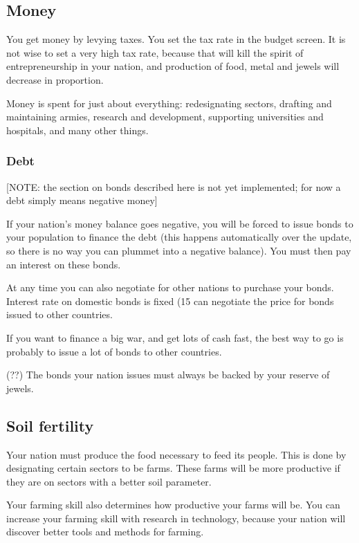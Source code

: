 \subsection{Money}
You get money by levying taxes.  You set the tax rate in the budget
screen.  It is not wise to set a very high tax rate, because that will
kill the spirit of entrepreneurship in your nation, and production of
food, metal and jewels will decrease in proportion.

Money is spent for just about everything: redesignating sectors,
drafting and maintaining armies, research and development, supporting
universities and hospitals, and many other things.

\subsubsection{Debt}

[NOTE: the section on bonds described here is not yet implemented;
for now a debt simply means negative money]

If your nation's money balance goes negative, you will be forced to
issue bonds to your population to finance the debt (this happens
automatically over the update, so there is no way you can plummet into
a negative balance).  You must then pay an interest on these bonds.

At any time you can also negotiate for other nations to purchase your
bonds.  Interest rate on domestic bonds is fixed (15%
can negotiate the price for bonds issued to other countries.

If you want to finance a big war, and get lots of cash fast, the best
way to go is probably to issue a lot of bonds to other countries.

(??) The bonds your nation issues must always be backed by your
reserve of jewels.

\subsection{Soil fertility}
Your nation must produce the food necessary to feed its people.  This is
done by designating certain sectors to be farms.  These farms will be
more productive if they are on sectors with a better soil parameter.

Your farming skill also determines how productive your farms will be.
You can increase your farming skill with research in technology, because
your nation will discover better tools and methods for farming.

